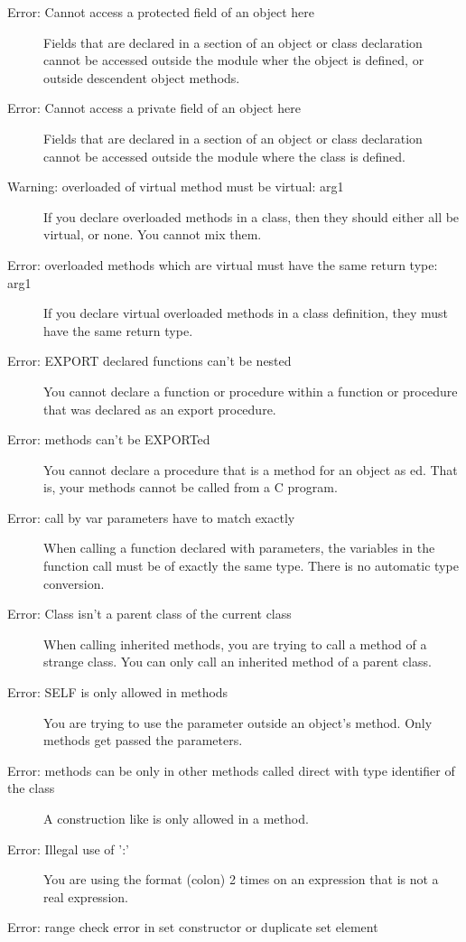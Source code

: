 \begin{description}
\item [Error: Cannot access a protected field of an object here]
 Fields that are declared in a  section of an object or class
 declaration cannot be accessed outside the module wher the object is
 defined, or outside descendent object methods.
\item [Error: Cannot access a private field of an object here]
 Fields that are declared in a  section of an object or class
 declaration cannot be accessed outside the module where the class is
 defined.
\item [Warning: overloaded of virtual method must be virtual: arg1]
 If you declare overloaded methods in a class, then they should either all be
 virtual, or none. You cannot mix them.
\item [Error: overloaded methods which are virtual must have the same return type: arg1]
 If you declare virtual overloaded methods in a class definition, they must
 have the same return type.
\item [Error: EXPORT declared functions can't be nested]
 You cannot declare a function or procedure within a function or procedure
 that was declared as an export procedure.
\item [Error: methods can't be EXPORTed]
 You cannot declare a procedure that is a method for an object as
 ed. That is, your methods cannot be called from a C program.
\item [Error: call by var parameters have to match exactly]
 When calling a function declared with  parameters, the variables in
 the function call must be of exactly the same type. There is no automatic
 type conversion. 
\item [Error: Class isn't a parent class of the current class]
 When calling inherited methods, you are trying to call a method of a strange
 class. You can only call an inherited method of a parent class.
\item [Error: SELF is only allowed in methods]
 You are trying to use the  parameter outside an object's method.
 Only methods get passed the  parameters.
\item [Error: methods can be only in other methods called direct with type identifier of the class]
 A construction like  is only allowed in a method.
\item [Error: Illegal use of ':']
 You are using the format \var{:} (colon) 2 times on an expression that 
 is not a real expression. 
\item [Error: range check error in set constructor or duplicate set element]

\end{description}
